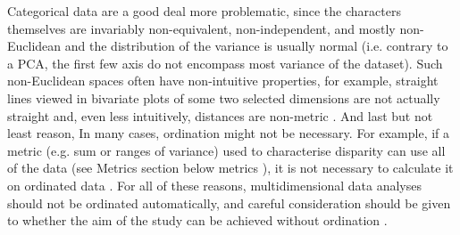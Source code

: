 \documentclass[12pt,letterpaper]{article}
\renewcommand{\subsection}[1]{%
\bigskip
\begin{center}
\begin{large}
\normalfont\itshape #1
\end{large}
\end{center}}
\begin{document}
Categorical data are a good deal more problematic, since the characters themselves are invariably non-equivalent, non-independent, and mostly non-Euclidean and the distribution of the variance is usually normal (i.e. contrary to a PCA, the first few axis do not encompass most variance of the dataset).
Such non-Euclidean spaces often have non-intuitive properties, for example, straight lines viewed in bivariate plots of some two selected dimensions are not actually straight and, even less intuitively, distances are non-metric \citep[][i.e. the distance between A and B is not equal to the distance between B and A]{Gerber2014-ol}.
And last but not least reason, In many cases, ordination might not be necessary.
For example, if a metric (e.g. sum or ranges of variance) used to characterise disparity can use all of the data (see Metrics section below metrics%
), it is not necessary to calculate it on ordinated data \citep{Close2015-qi}.
For all of these reasons, multidimensional data analyses should not be ordinated automatically, and careful consideration should be given to whether the aim of the study can be achieved without ordination \citep{lloyd2016,lloyd2018}.


\end{document}
